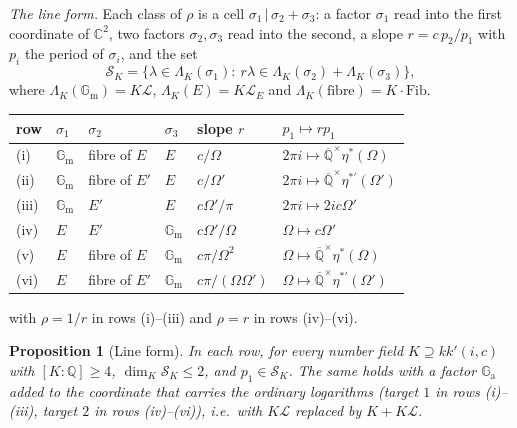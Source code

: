 \documentclass[11pt]{amsart}
\newtheorem{proposition}[theorem]{Proposition}
\theoremstyle{definition}
\newcommand{\Qb}{\overline{\mathbb{Q}}}
\newcommand{\C}{\mathbb{C}}
\newcommand{\Q}{\mathbb{Q}}
\newcommand{\Ga}{\mathbb{G}_{\mathrm a}}
\newcommand{\Gm}{\mathbb{G}_{\mathrm m}}
\newcommand{\Lg}{\mathcal{L}}
\newcommand{\Fib}{\mathrm{Fib}}
\begin{document}
\noindent\emph{The line form.} Each class of $\rho$ is a cell $\sigma_1\,|\,\sigma_2+\sigma_3$: a factor $\sigma_1$ read into
the first coordinate of $\C^2$, two factors $\sigma_2,\sigma_3$ read into the second, a slope $r=c\,p_2/p_1$ with $p_i$ the
period of $\sigma_i$, and the set
\[
\mathcal S_K=\{\lambda\in\Lambda_K(\sigma_1):\ r\lambda\in\Lambda_K(\sigma_2)+\Lambda_K(\sigma_3)\},
\]
where $\Lambda_K(\Gm)=K\Lg$, $\Lambda_K(E)=K\Lg_E$ and $\Lambda_K(\text{fibre})=K\cdot\Fib$.
\begin{center}
{\small
\begin{tabular}{llllll}
row & $\sigma_1$ & $\sigma_2$ & $\sigma_3$ & slope $r$ & $p_1\mapsto rp_1$\\\hline
(i) & $\Gm$ & fibre of $E$ & $E$ & $c/\Omega$ & $2\pi i\mapsto\Qb^\times\eta^*(\Omega)$\\
(ii) & $\Gm$ & fibre of $E'$ & $E$ & $c/\Omega'$ & $2\pi i\mapsto\Qb^\times\eta^{*\prime}(\Omega')$\\
(iii) & $\Gm$ & $E'$ & $E$ & $c\Omega'/\pi$ & $2\pi i\mapsto2ic\Omega'$\\
(iv) & $E$ & $E'$ & $\Gm$ & $c\Omega'/\Omega$ & $\Omega\mapsto c\Omega'$\\
(v) & $E$ & fibre of $E$ & $\Gm$ & $c\pi/\Omega^2$ & $\Omega\mapsto\Qb^\times\eta^*(\Omega)$\\
(vi) & $E$ & fibre of $E'$ & $\Gm$ & $c\pi/(\Omega\Omega')$ & $\Omega\mapsto\Qb^\times\eta^{*\prime}(\Omega')$
\end{tabular}
}
\end{center}
with $\rho=1/r$ in rows (i)--(iii) and $\rho=r$ in rows (iv)--(vi).

\begin{proposition}[Line form]\label{prop:C42line}
In each row, for every number field $K\supseteq kk'(i,c)$ with $[K:\Q]\ge4$, $\dim_K\mathcal S_K\le2$, and $p_1\in\mathcal S_K$.
The same holds with a factor $\Ga$ added to the coordinate that carries the ordinary logarithms (target $1$ in rows
(i)--(iii), target $2$ in rows (iv)--(vi)), i.e.\ with $K\Lg$ replaced by $K+K\Lg$.
\end{proposition}
\end{document}
